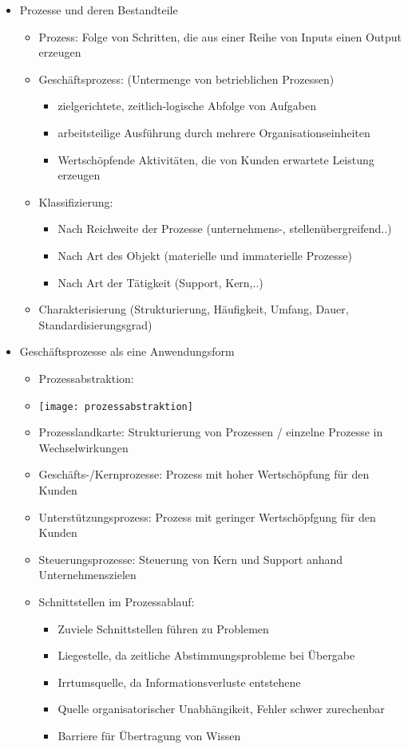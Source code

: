 \begin{itemize}
\item Prozesse und deren Bestandteile
	\begin{itemize}
	\item Prozess: Folge von Schritten, die aus einer Reihe von Inputs einen Output erzeugen
	\item Geschäftsprozess: (Untermenge von betrieblichen Prozessen) 
		\begin{itemize}
		\item zielgerichtete, zeitlich-logische Abfolge von Aufgaben
		\item arbeitsteilige Ausführung durch mehrere Organisationseinheiten
		\item Wertschöpfende Aktivitäten, die von Kunden erwartete Leistung erzeugen
		\end{itemize}
	\item Klassifizierung:
		\begin{itemize}
		\item Nach Reichweite der Prozesse (unternehmens-, stellenübergreifend..)
		\item Nach Art des Objekt (materielle und immaterielle Prozesse)
		\item Nach Art der Tätigkeit (Support, Kern,..)
		\end{itemize}
	\item Charakterisierung (Strukturierung, Häufigkeit, Umfang, Dauer, Standardisierungsgrad)
	\end{itemize}

\item Geschäftsprozesse als eine Anwendungsform
	\begin{itemize}
	\item Prozessabstraktion:
	\item[] \texttt{[image: prozessabstraktion]}	
	\item Prozesslandkarte: Strukturierung von Prozessen / einzelne Prozesse in Wechselwirkungen
	\item Geschäfts-/Kernprozesse: Prozess mit hoher Wertschöpfung für den Kunden
	\item Unterstützungsprozess: Prozess mit geringer Wertschöpfgung für den Kunden 
	\item Steuerungsprozesse: Steuerung von Kern und Support anhand Unternehmenszielen
	\item Schnittstellen im Prozessablauf:
		\begin{itemize}
		\item Zuviele Schnittstellen führen zu Problemen
		\item Liegestelle, da zeitliche Abstimmungsprobleme bei Übergabe
		\item Irrtumsquelle, da Informationsverluste entstehene
		\item Quelle organisatorischer Unabhängikeit, Fehler schwer zurechenbar
		\item Barriere für Übertragung von Wissen
		\end{itemize}
	\end{itemize}
\end{itemize}

